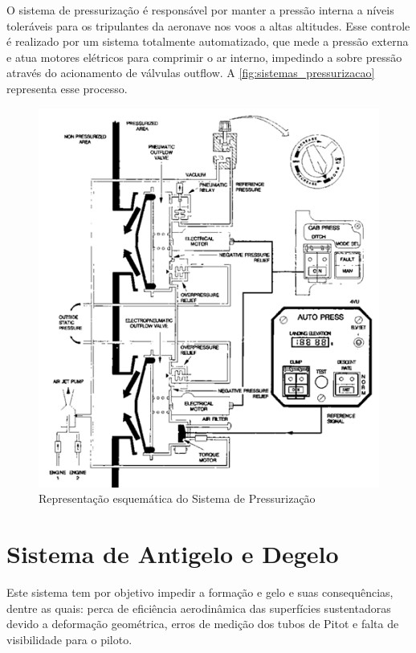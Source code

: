 O sistema de pressurização é responsável por manter a pressão interna a níveis toleráveis para os tripulantes da aeronave nos voos a altas altitudes.
Esse controle é realizado por um sistema totalmente automatizado, que mede a pressão externa e atua motores elétricos para comprimir o ar interno, impedindo a sobre pressão através do acionamento de válvulas outflow.
A \autoref{fig:sistemas_pressurizacao} representa esse processo.

\begin{figure}
\centering
\includegraphics[width=\textwidth]{images/parte3/sistemas_pressurizacao.png}
\caption{Representação esquemática do Sistema de Pressurização}
\label{fig:sistemas_pressurizacao}
\end{figure}


\section{Sistema de Antigelo e Degelo}

Este sistema tem por objetivo impedir a formação e gelo e suas consequências, dentre as quais: perca de eficiência aerodinâmica das superfícies sustentadoras devido a deformação geométrica, erros de medição dos tubos de Pitot e falta de visibilidade para o piloto.

